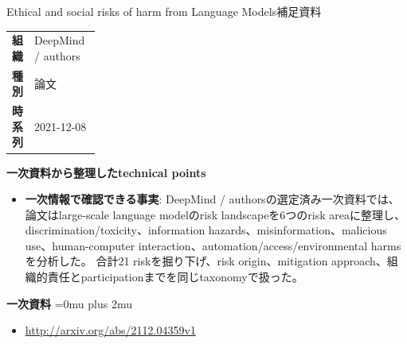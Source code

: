 \begin{technicalnote}{Ethical and social risks of harm from Language Models}{補足資料}
\begingroup
\begin{tabularx}{\linewidth}{@{}>{\bfseries}p{0.22\linewidth}X@{}}
組織 & DeepMind / authors \\
種別 & 論文 \\
時系列 & 2021-12-08 \\
\end{tabularx}
\smallskip
\begin{minipage}{\linewidth}
{\bfseries 一次資料から整理したtechnical points}
\begin{itemize}[leftmargin=1.5em,itemsep=0.35em]
\item \textbf{一次情報で確認できる事実}: DeepMind / authorsの選定済み一次資料では、論文はlarge-scale language modelのrisk landscapeを6つのrisk areaに整理し、discrimination/toxicity、information hazards、misinformation、malicious use、human-computer interaction、automation/access/environmental harmsを分析した。 合計21 riskを掘り下げ、risk origin、mitigation approach、組織的責任とparticipationまでを同じtaxonomyで扱った。
\end{itemize}
\begin{minipage}{\linewidth}
\begin{samepage}
{\bfseries 一次資料}
\begingroup\sloppy
\Urlmuskip=0mu plus 2mu\relax
\begin{itemize}[leftmargin=1.5em,itemsep=0.25em]
\item {\scriptsize\url{http://arxiv.org/abs/2112.04359v1}}
\end{itemize}
\endgroup
\end{samepage}
\end{minipage}
\end{minipage}
\endgroup
\end{technicalnote}
\medskip
